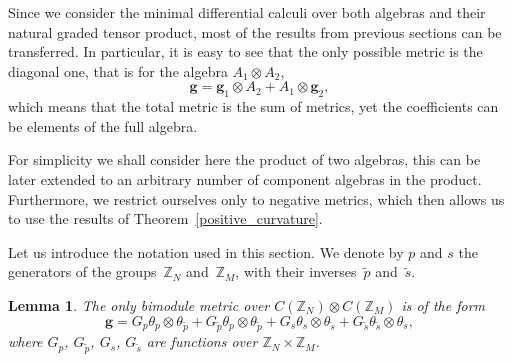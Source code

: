 \documentclass[pdftex]{sigma}
\numberwithin{equation}{section}
\newtheorem{Lemma}[Theorem]{Lemma}
\newcommand{\Z}{\mathbb{Z}}
\newcommand{\ip}{{\tilde{p}}}
\newcommand{\is}{{\tilde{s}}}
\begin{document}
Since we consider the minimal differential calculi over both algebras and their
natural graded tensor product, most of the results from previous sections can
be transferred. In particular, it is easy to see that the only possible metric is the
diagonal one, that is for the algebra $A_1 \otimes A_2$,
\[ \mathbf{g} = \mathbf{g}_1 \otimes A_2 + A_1 \otimes \mathbf{g}_2, \]
which means that the total metric is the sum of metrics, yet the coefficients can
be elements of the full algebra.

For simplicity we shall consider here the product of two algebras, this can
be later extended to an arbitrary number of component algebras in the product.
Furthermore, we restrict ourselves only to negative metrics, which then allows
us to use the results of Theorem~\ref{positive_curvature}.

Let us introduce the notation used in this section. We denote by $p$ and $s$ the
generators of the groups~$\Z_N$ and~$\Z_M$, with their inverses~$\ip$ and~$\is$.

\begin{Lemma}The only bimodule metric over $C(\Z_N) \otimes C(\Z_M)$ is of the form
\begin{equation*}%
\mathbf{g} = G_p \theta_p \otimes \theta_\ip
+ G_\ip \theta_p \otimes \theta_\ip
+ G_s \theta_s \otimes \theta_\is
+ G_\is \theta_\is \otimes \theta_s,
\end{equation*}
where $G_p$, $G_\ip$, $G_s$, $G_\is$ are functions over $\Z_N \times \Z_M$.
\end{Lemma}
\end{document}
